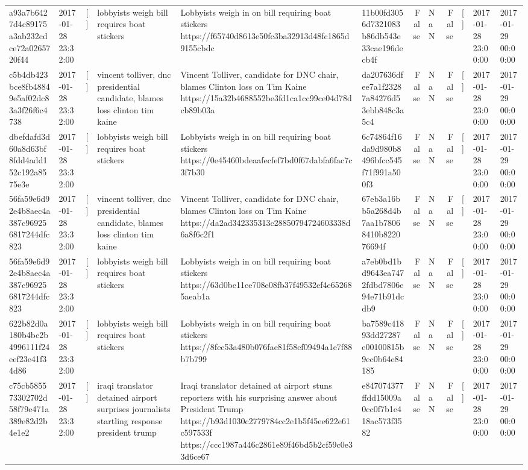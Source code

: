 \begin{tabular}{llllllrlrlll}
a93a7b6427d4c89175a3ab232cdce72a0265720f44 & 2017-01-28 23:32:00 & [] & lobbyists weigh bill requires boat stickers & Lobbyists weigh in on bill requiring boat stickers https://f65740d8613e50fc3ba32913d48fc1865d9155cbdc & 11b00fd3056d7321083b86db543e33cae196decb4f & False & NaN & False & [] & 2017-01-28 23:00:00 & 2017-01-29 00:00:00 \\
c5b4db423bce8fb48849e5af02dc83a3f26f6c4738 & 2017-01-28 23:32:00 & [] & vincent tolliver, dnc presidential candidate, blames loss clinton tim kaine & Vincent Tolliver, candidate for DNC chair, blames Clinton loss on Tim Kaine https://15a32b4688552be3fd1ca1cc99ce04d78dcb89b03a & da207636dfee7a1f23287a84276d53ebb848c3a5c4 & False & NaN & False & [] & 2017-01-28 23:00:00 & 2017-01-29 00:00:00 \\
dbefdafd3d60a8d63bf8fdd4add152c192a8575e3e & 2017-01-28 23:32:00 & [] & lobbyists weigh bill requires boat stickers & Lobbyists weigh in on bill requiring boat stickers https://0e45460bdeaafecfef7bd0f67dabfa6fac7c3f7b30 & 6c74864f16da9d980b8496bfcc545f71f991a500f3 & False & NaN & False & [] & 2017-01-28 23:00:00 & 2017-01-29 00:00:00 \\
56fa59e6d92e4b8aec4a387c969256817244dfc823 & 2017-01-28 23:32:00 & [] & vincent tolliver, dnc presidential candidate, blames loss clinton tim kaine & Vincent Tolliver, candidate for DNC chair, blames Clinton loss on Tim Kaine https://da2ad342335313c28850794724603338d6a8f6c2f1 & 67eb3a16bb5a268d4b7aa1b78068410b822076694f & False & NaN & False & [] & 2017-01-28 23:00:00 & 2017-01-29 00:00:00 \\
56fa59e6d92e4b8aec4a387c969256817244dfc823 & 2017-01-28 23:32:00 & [] & lobbyists weigh bill requires boat stickers & Lobbyists weigh in on bill requiring boat stickers https://63d0be11ee708e08fb37f49532ef4e652685aeab1a & a7eb0bd1bd9643ea7472fdbd7806e94e71b91dcdb9 & False & NaN & False & [] & 2017-01-28 23:00:00 & 2017-01-29 00:00:00 \\
622b82d0a180b4bc2b4996111f24eef23e41f34d86 & 2017-01-28 23:32:00 & [] & lobbyists weigh bill requires boat stickers & Lobbyists weigh in on bill requiring boat stickers https://8fec53a480b076fae81f58ef09494a1e7f88b7b799 & ba7589c41893dd27287e00100815b9ec0b64e84185 & False & NaN & False & [] & 2017-01-28 23:00:00 & 2017-01-29 00:00:00 \\
c75cb585573302702d58f79e471a389e82d2b4e1e2 & 2017-01-28 23:32:00 & [] & iraqi translator detained airport surprises journalists startling response president trump & Iraqi translator detained at airport stuns reporters with his surprising answer about President Trump https://b93d1030c2779784cc2e1b5f45ee622e61c597533f https://ccc1987a446c2861e89f46bd5b2cf59c0e33d6ce67 & e847074377ffdd15009a0cc0f7b1e418ac573f3582 & False & NaN & False & [] & 2017-01-28 23:00:00 & 2017-01-29 00:00:00 \\

\end{tabular}
